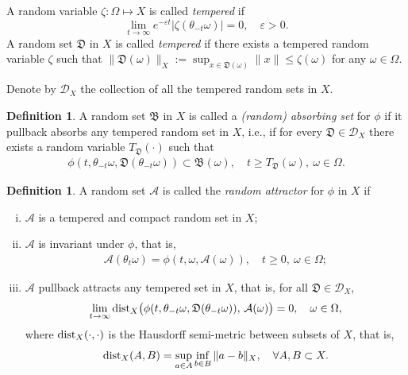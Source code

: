 \documentclass{elsarticle}
\theoremstyle{definition}
\newtheorem{definition}[theorem]{Definition}
\numberwithin{equation}{section}
\newcommand{\dist}{{\rm dist}}
\begin{document}
A random variable $\zeta:\Omega\mapsto X$ is called {\em tempered} if
\[
  \lim_{t\to \infty} e^{-\varepsilon t} |\zeta(\theta_{-t}\omega)| =0, \quad \varepsilon >0.
\]
A random set $\mathfrak D$ in $X$  is called {\emph{tempered}}  if there exists a   tempered random variable $\zeta$ such that $\|\mathfrak D(\omega)\|_X:=\sup_{x\in \mathfrak D(\omega)} \|x\| \leq \zeta(\omega)$ for any $\omega\in \Omega$.

\smallskip
Denote by $\mathcal{D}_X$  the collection of all the tempered random sets in $X$.

 \begin{definition}
A    random set $\mathfrak{B}$ in $X$ is called a {\emph{(random)  absorbing set}} for $\phi$ if  it pullback absorbs any tempered random set in $X$, i.e., if for every  $\mathfrak D\in\mathcal{D}_X$   there exists a random variable $T_{\mathfrak D} (\cdot)$ such that
\begin{align*}
\phi(t,\theta_{-t}\omega, \mathfrak D(\theta_{-t}\omega))\subset \mathfrak{B}(\omega),\quad t\geq T_{\mathfrak D}(\omega),\  \omega\in\Omega.
\end{align*}
\end{definition}


\begin{definition}
A random set $\mathcal{A}$  is called  the \emph{random attractor}   for  $\phi$ in $X$ if
\begin{enumerate}[(i)]
\item  $\mathcal{A}$ is a tempered and compact random set in $X$;

 \item  $\mathcal{A}$ is invariant under $\phi$, that is,
\begin{align*}
\mathcal{A}(\theta_t\omega)=\phi(t,\omega,\mathcal{A}(\omega)), \quad t\geq0,~\omega\in\Omega;
\end{align*}

 \item $\mathcal{A}$  pullback attracts any tempered set in $X$, that is,  for all $\mathfrak D\in  \mathcal{D}_X$,
 \[
\lim\limits_{t\rightarrow\infty} {\rm dist}_{X} \big(\phi(t,\theta_{-t}\omega,\mathfrak D(\theta_{-t}\omega)), \, \mathcal{A}(\omega) \big)=0,\quad \omega\in\Omega ,
 \]
where
$\dist _{X}(\cdot, \cdot) $  is  the Hausdorff semi-metric between   subsets  of  $ X$, that is,
\[
 \dist_{X}(A,B)= \sup_{a\in A} \inf_{b\in B} \|a-b\|_X, \quad \forall A,B\subset X.
\]
\end{enumerate}
\end{definition}
\end{document}
